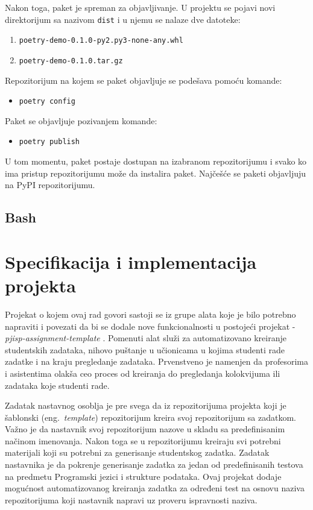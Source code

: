 \documentclass[12pt]{report}
\begin{document}
Nakon toga, paket je spreman za objavljivanje. U projektu se pojavi novi direktorijum sa nazivom \texttt{dist} i u njemu se nalaze dve datoteke:

\begin{enumerate}
    \item \texttt{poetry-demo-0.1.0-py2.py3-none-any.whl}
    \item \texttt{poetry-demo-0.1.0.tar.gz}
\end{enumerate}

Repozitorijum na kojem se paket objavljuje se podešava pomoću komande:

\begin{itemize}
    \item \texttt{poetry config}
\end{itemize}

Paket se objavljuje pozivanjem komande:

\begin{itemize}
    \item \texttt{poetry publish}
\end{itemize}

U tom momentu, paket postaje dostupan na izabranom repozitorijumu i svako ko ima pristup repozitorijumu može da instalira paket. Najčešće se paketi objavljuju na PyPI repozitorijumu.

\section{Bash}

\chapter{Specifikacija i implementacija projekta}

Projekat o kojem ovaj rad govori sastoji se iz grupe alata koje je bilo potrebno napraviti i povezati da bi se dodale nove funkcionalnosti u postojeći projekat - \textit{pjisp-assignment-template} \cite{pjisp-assignment-template}. Pomenuti alat služi za automatizovano kreiranje studentskih zadataka, nihovo puštanje u učionicama u kojima studenti rade zadatke i na kraju pregledanje zadataka. Prvenstveno je namenjen da profesorima i asistentima olakša ceo proces od kreiranja do pregledanja kolokvijuma ili zadataka koje studenti rade.

Zadatak nastavnog osoblja je pre svega da iz repozitorijuma projekta koji je šablonski (eng.\ \textit{template}) repozitorijum kreira svoj repozitorijum sa zadatkom. Važno je da nastavnik svoj repozitorijum nazove u skladu sa predefinisanim načinom imenovanja. Nakon toga se u repozitorijumu kreiraju svi potrebni materijali koji su potrebni za generisanje studentskog zadatka. Zadatak nastavnika je da pokrenje generisanje zadatka za jedan od predefinisanih testova na predmetu Programski jezici i strukture podataka. Ovaj projekat dodaje mogućnost automatizovanog kreiranja zadatka za određeni test na osnovu naziva repozitorijuma koji nastavnik napravi uz proveru ispravnosti naziva.
\end{document}
